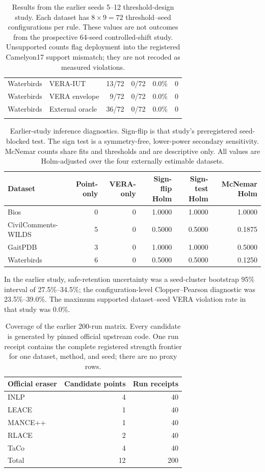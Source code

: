 \begin{table}[!htbp]
\begin{tabular}{llrrrr}
Waterbirds & VERA-IUT & 13/72 & 0/72 & 0.0\% & 0 \\
Waterbirds & VERA envelope & 9/72 & 0/72 & 0.0\% & 0 \\
Waterbirds & External oracle & 36/72 & 0/72 & 0.0\% & 0 \\
\addlinespace
\bottomrule
\end{tabular}
\caption{Results from the earlier seeds 5--12 threshold-design study. Each dataset has $8\times9=72$ threshold--seed configurations per rule. These values are not outcomes from the prospective 64-seed controlled-shift study. Unsupported counts flag deployment into the registered Camelyon17 support mismatch; they are not recoded as measured violations.}
\end{table}

\begin{table}[!htbp]
\centering\scriptsize
\begin{tabular}{lrrrrr}
\toprule
Dataset & Point-only & VERA-only & Sign-flip Holm & Sign-test Holm & McNemar Holm \\
\midrule
Bios & 0 & 0 & 1.0000 & 1.0000 & 1.0000 \\
CivilComments-WILDS & 5 & 0 & 0.5000 & 0.5000 & 0.1875 \\
GaitPDB & 3 & 0 & 1.0000 & 1.0000 & 0.5000 \\
Waterbirds & 6 & 0 & 0.5000 & 0.5000 & 0.1250 \\
\bottomrule
\end{tabular}
\caption{Earlier-study inference diagnostics. Sign-flip is that study's preregistered seed-blocked test. The sign test is a symmetry-free, lower-power secondary sensitivity. McNemar counts share fits and thresholds and are descriptive only. All values are Holm-adjusted over the four externally estimable datasets.}
\end{table}

In the earlier study, safe-retention uncertainty was a seed-cluster bootstrap
95\% interval of 27.5\%--34.5\%; the configuration-level Clopper--Pearson
diagnostic was 23.5\%--39.0\%. The maximum supported dataset--seed VERA
violation rate in that study was 0.0\%.

\begin{table}[!htbp]
\centering\small
\begin{tabular}{lrr}
\toprule
Official eraser & Candidate points & Run receipts \\
\midrule
INLP & 4 & 40 \\
LEACE & 1 & 40 \\
MANCE++ & 1 & 40 \\
RLACE & 2 & 40 \\
TaCo & 4 & 40 \\
\midrule
Total & 12 & 200 \\
\bottomrule
\end{tabular}
\caption{Coverage of the earlier 200-run matrix. Every candidate is generated by pinned official upstream code. One run receipt contains the complete registered strength frontier for one dataset, method, and seed; there are no proxy rows.}
\end{table}
